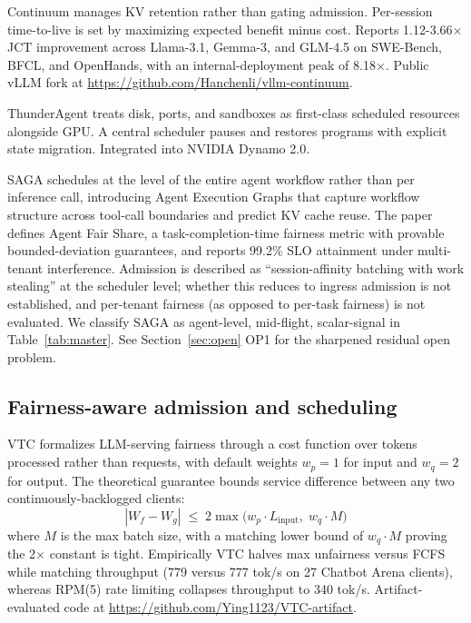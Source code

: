 Continuum \citep{li2026continuum} manages KV retention rather than
gating admission. Per-session time-to-live is set by maximizing
expected benefit minus cost. Reports 1.12-3.66$\times$ JCT improvement
across Llama-3.1, Gemma-3, and GLM-4.5 on SWE-Bench, BFCL, and
OpenHands, with an internal-deployment peak of 8.18$\times$. Public
vLLM fork at \url{https://github.com/Hanchenli/vllm-continuum}.

ThunderAgent \citep{kang2026thunderagent} treats disk, ports, and
sandboxes as first-class scheduled resources alongside GPU. A central
scheduler pauses and restores programs with explicit state migration.
Integrated into NVIDIA Dynamo 2.0.

SAGA \citep{guo2026saga} schedules at the level of the entire agent
workflow rather than per inference call, introducing Agent Execution
Graphs that capture workflow structure across tool-call boundaries
and predict KV cache reuse. The paper defines Agent Fair Share, a
task-completion-time fairness metric with provable bounded-deviation
guarantees, and reports 99.2\% SLO attainment under multi-tenant
interference. Admission is described as ``session-affinity batching
with work stealing'' at the scheduler level; whether this reduces to
ingress admission is not established, and per-tenant fairness (as
opposed to per-task fairness) is not evaluated. We classify SAGA as
agent-level, mid-flight, scalar-signal in Table~\ref{tab:master}.
See Section~\ref{sec:open} OP1 for the sharpened residual open
problem.

\subsection{Fairness-aware admission and scheduling}

VTC \citep{sheng2024vtc} formalizes LLM-serving fairness through a
cost function over tokens processed rather than requests, with default
weights $w_p = 1$ for input and $w_q = 2$ for output. The theoretical
guarantee bounds service difference between any two
continuously-backlogged clients:
%
\begin{equation}
|W_f - W_g| \;\le\; 2 \max\bigl(w_p \cdot L_{\text{input}},\; w_q \cdot M\bigr)
\label{eq:vtc-bound}
\end{equation}
%
where $M$ is the max batch size, with a matching lower bound of
$w_q \cdot M$ proving the 2$\times$ constant is tight. Empirically VTC
halves max unfairness versus FCFS while matching throughput (779
versus 777 tok/s on 27 Chatbot Arena clients), whereas RPM(5) rate
limiting collapses throughput to 340 tok/s. Artifact-evaluated code at
\url{https://github.com/Ying1123/VTC-artifact}.

